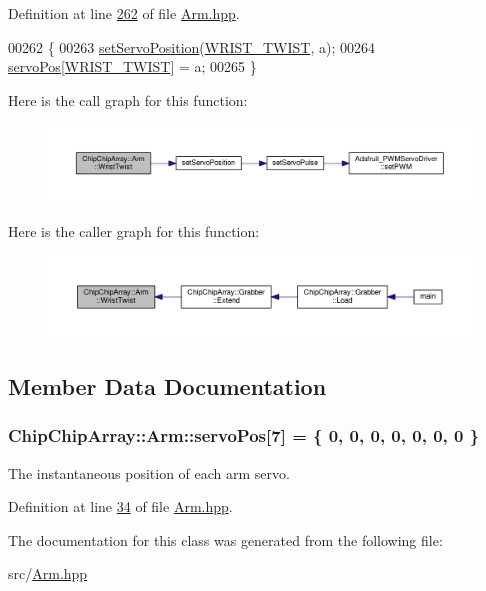 Definition at line \hyperlink{Arm_8hpp_source_l00262}{262} of file \hyperlink{Arm_8hpp_source}{Arm.\+hpp}.


\begin{DoxyCode}
00262                                 \{
00263         \hyperlink{Servo__Position__Shell_8cpp_abd2cd3c2e36d42a2178a6f2fd12af905}{setServoPosition}(\hyperlink{Arm_8hpp_a02a3a5fbd2fb97badde7f301b7499e05}{WRIST\_TWIST}, a);
00264         \hyperlink{classChipChipArray_1_1Arm_a9ddcea9544b6e2a4315b9dd705df8fdd}{servoPos}[\hyperlink{Arm_8hpp_a02a3a5fbd2fb97badde7f301b7499e05}{WRIST\_TWIST}] = a;
00265     \}
\end{DoxyCode}


Here is the call graph for this function\+:
\nopagebreak
\begin{figure}[H]
\begin{center}
\leavevmode
\includegraphics[width=350pt]{classChipChipArray_1_1Arm_a35ec7756840d9d32dcfbb88d831f087f_cgraph}
\end{center}
\end{figure}




Here is the caller graph for this function\+:
\nopagebreak
\begin{figure}[H]
\begin{center}
\leavevmode
\includegraphics[width=350pt]{classChipChipArray_1_1Arm_a35ec7756840d9d32dcfbb88d831f087f_icgraph}
\end{center}
\end{figure}




\subsection{Member Data Documentation}
\hypertarget{classChipChipArray_1_1Arm_a9ddcea9544b6e2a4315b9dd705df8fdd}{
\subsubsection[{servo\+Pos}]{ Chip\+Chip\+Array\+::\+Arm\+::servo\+Pos\mbox{[}7\mbox{]} = \{ 0, 0, 0, 0, 0, 0, 0 \}}}\label{classChipChipArray_1_1Arm_a9ddcea9544b6e2a4315b9dd705df8fdd}
The instantaneous position of each arm servo. 

Definition at line \hyperlink{Arm_8hpp_source_l00034}{34} of file \hyperlink{Arm_8hpp_source}{Arm.\+hpp}.



The documentation for this class was generated from the following file\+:\begin{DoxyCompactItemize}
\item 
src/\hyperlink{Arm_8hpp}{Arm.\+hpp}\end{DoxyCompactItemize}
